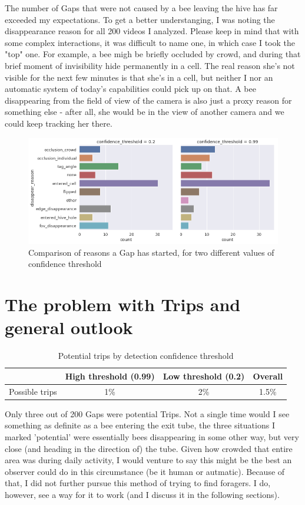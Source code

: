 The number of Gaps that were not caused by a bee leaving the hive has far exceeded my expectations. To get a better understanging, I was noting the disappearance reason for all 200 videos I analyzed. Please keep in mind that with some complex interactions, it was difficult to name one, in which case I took the "top" one. For example, a bee migh be briefly occluded by crowd, and during that brief moment of invisibility hide permanently in a cell. The real reason she's not visible for the next few minutes is that she's in a cell, but neither I nor an automatic system of today's capabilities could pick up on that. A bee disappearing from the field of view of the camera is also just a proxy reason for something else - after all, she would be in the view of another camera and we could keep tracking her there.

\begin{figure}[htbp!] 
\centering
\includegraphics[width=1.0\textwidth]{gap-reason-dist}
\caption[gap-reason-dist]{Comparison of reasons a Gap has started, for two different values of confidence threshold}
\label{fig:gap-reason-dist}
\end{figure}


\section{The problem with Trips and general outlook}


\begin{table}[h]
    \caption{Potential trips by detection confidence threshold}
    \centering
    \label{table:conf_comparison}
    \begin{tabular}{@{}lccc@{}}
        \toprule
                       & High threshold (0.99) & Low threshold (0.2) & Overall \\ \midrule
        Possible trips & 1\%                   & 2\%                 & 1.5\%  
    \end{tabular}
\end{table}


Only three out of 200 Gaps were potential Trips. Not a single time would I see something as definite as a bee entering the exit tube, the three situations I marked 'potential' were essentially bees disappearing in some other way, but very close (and heading in the direction of) the tube. Given how crowded that entire area was during daily activity, I would venture to say this might be the best an observer could do in this circumstance (be it human or autmatic). Because of that, I did not further pursue this method of trying to find foragers. I do, however, see a way for it to work (and I discuss it in the following sections).
